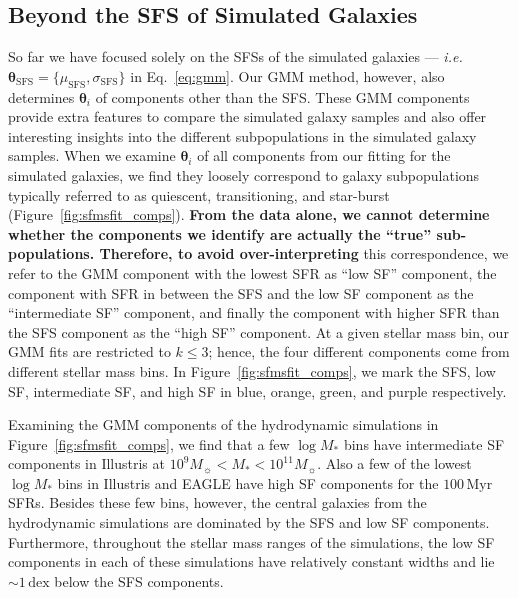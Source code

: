 \documentclass[tighten, preprint]{aastex62}
\begin{document}
\subsection{Beyond the SFS of Simulated Galaxies} \label{sec:beyondsfms}
So far we have focused solely on the SFSs of the simulated galaxies --- \emph{i.e.} 
$\bm{\theta}_\mathrm{SFS} = \{\mu_\mathrm{SFS}, \sigma_\mathrm{SFS} \}$ 
in Eq.~\ref{eq:gmm}. Our GMM method, however, also determines 
$\bm{\theta}_i$ of components other than the SFS. These GMM components 
provide extra features to compare the simulated galaxy samples and also 
offer interesting insights into the different subpopulations in the simulated 
galaxy samples. When we examine $\bm{\theta}_i$ of all components from 
our fitting for the simulated galaxies, we find they loosely correspond 
to galaxy subpopulations typically referred to as quiescent, transitioning, 
and star-burst (Figure~\ref{fig:sfmsfit_comps}). 
{\bf \color{red}
From the data alone, we cannot determine whether the components we 
identify are actually the ``true'' sub-populations.
Therefore, to avoid over-interpreting 
}
this correspondence, we refer to the GMM component with the lowest SFR as 
``low SF'' component, the component with SFR in between the SFS and the 
low SF component as the ``intermediate SF'' component, and finally the 
component with higher SFR than the SFS component as the ``high SF'' component. 
At a given stellar mass bin, our GMM fits are restricted to $k\leq3$; hence, 
the four different components come from different stellar mass bins. 
In Figure~\ref{fig:sfmsfit_comps}, we mark the SFS, low SF, intermediate SF, 
and high SF in blue, orange, green, and purple respectively.

Examining the GMM components of the hydrodynamic simulations in 
Figure~\ref{fig:sfmsfit_comps}, we find that a few $\log M_*$ bins have 
intermediate SF components in Illustris at $10^9 M_\sun < M_* < 10^{11}M_\sun$.
Also a few of the lowest $\log M_*$ bins in Illustris and EAGLE have high SF
components for the $100\,\mathrm{Myr}$ SFRs. Besides these few 
bins, however, the central galaxies from the hydrodynamic simulations are
dominated by the SFS and low SF components. Furthermore, 
throughout the stellar mass ranges of the simulations, the low SF 
components in each of these simulations have relatively constant widths and 
lie ${\sim}1\,\mathrm{dex}$ below the SFS components.
\end{document}
